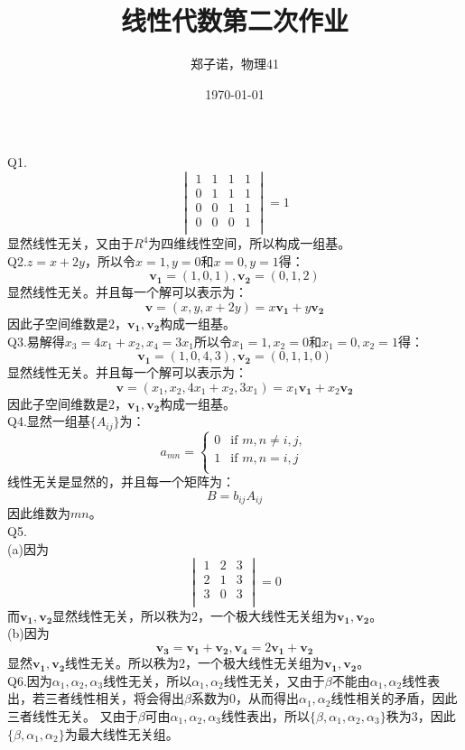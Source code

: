 \documentclass[utf8]{ctexart}
\title{线性代数第二次作业}
\author{郑子诺，物理41}
\date{\today}
\begin{document}
\maketitle
\noindent Q1.
\[
\begin{vmatrix}
	1&1&1&1\\
	0&1&1&1\\
	0&0&1&1\\
	0&0&0&1\\
\end{vmatrix}
=1
\]
显然线性无关，又由于$R^4$为四维线性空间，所以构成一组基。\\
Q2.$z=x+2y$，所以令$x=1,y=0$和$x=0,y=1$得：
\[\mathbf{v_1}=(1,0,1),\mathbf{v_2}=(0,1,2)\]显然线性无关。并且每一个解可以表示为：
\[\mathbf{v}=(x,y,x+2y)=x\mathbf{v_1}+y\mathbf{v_2}\]因此子空间维数是$2$，$\mathbf{v_1},\mathbf{v_2}$构成一组基。\\
Q3.易解得$x_3=4x_1+x_2,x_4=3x_1$所以令$x_1=1,x_2=0$和$x_1=0,x_2=1$得：
\[\mathbf{v_1}=(1,0,4,3),\mathbf{v_2}=(0,1,1,0)\]显然线性无关。并且每一个解可以表示为：
\[\mathbf{v}=(x_1,x_2,4x_1+x_2,3x_1)=x_1\mathbf{v_1}+x_2\mathbf{v_2}\]因此子空间维数是$2$，$\mathbf{v_1},\mathbf{v_2}$构成一组基。\\
Q4.显然一组基$\{A_{ij}\}$为：
\[a_{mn}=
\begin{cases}
	0 &\text{if } m,n\neq i,j,\\
	1 &\text{if } m,n=i,j\\
\end{cases}\]
线性无关是显然的，并且每一个矩阵为：
\[B=b_{ij}A_{ij}\]因此维数为$mn$。\\
Q5.\\
(a)因为
\[
\begin{vmatrix}
	1&2&3\\
	2&1&3\\
	3&0&3\\
\end{vmatrix}
=0
\]
而$\mathbf{v_1},\mathbf{v_2}$显然线性无关，所以秩为$2$，一个极大线性无关组为$\mathbf{v_1},\mathbf{v_2}$。\\
(b)因为
\[\mathbf{v_3}=\mathbf{v_1}+\mathbf{v_2},\mathbf{v_4}=2\mathbf{v_1}+\mathbf{v_2}\]
显然$\mathbf{v_1},\mathbf{v_2}$线性无关。所以秩为$2$，一个极大线性无关组为$\mathbf{v_1},\mathbf{v_2}$。\\
Q6.因为$\alpha_1,\alpha_2,\alpha_3$线性无关，所以$\alpha_1,\alpha_2$线性无关，又由于$\beta$不能由$\alpha_1,\alpha_2$线性表出，若三者线性相关，将会得出$\beta$系数为$0$，从而得出$\alpha_1,\alpha_2$线性相关的矛盾，因此三者线性无关。
又由于$\beta$可由$\alpha_1,\alpha_2,\alpha_3$线性表出，所以$\{\beta,\alpha_1,\alpha_2,\alpha_3\}$秩为$3$，因此$\{\beta,\alpha_1,\alpha_2\}$为最大线性无关组。\\
\end{document}
